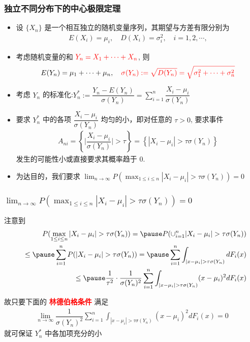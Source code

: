 \documentclass[Prob-All.tex]{subfiles}
\begin{document}
\begin{frame}
	\frametitle{独立不同分布下的中心极限定理}
	\begin{itemize}[<+-|alert@+>]
		\item 设 $\{X_n\}$ 是一个相互独立的随机变量序列，其期望与方差有限分别为
		\begin{eqnarray*}
			E(X_i)=\mu_i, \quad D(X_i)=\sigma_i^2, \quad i=1,2,\cdots,
		\end{eqnarray*}
		\item 考虑随机变量的和 $\textcolor{red}{Y_n=X_1+\cdots+X_n}$, 则
		\begin{eqnarray*}
			E(Y_n)=\mu_1+\cdots+\mu_n,\quad \textcolor{red}{\sigma(Y_n):=\sqrt{D(Y_n)}=\sqrt{\sigma_1^2+\cdots+\sigma_n^2}}
		\end{eqnarray*}
		\item 考虑 $Y_n$ 的标准化:$ Y_n^*:=\dfrac{Y_n-E (Y_n)}{\sigma (Y_n)}=\sum_{i=1}^n\dfrac{X_i-\mu_i}{\sigma (Y_n)}$
		\item 要求 $Y_n^*$ 中的各项 $\dfrac{X_i-\mu_i}{\sigma (Y_n)}$ 均匀的小，即对任意的 $\tau>0$, 要求事件
		\begin{eqnarray*}
			A_{ni}=\left\{\big|\dfrac{X_i-\mu_i}{\sigma(Y_n)}\big|>\tau\right\}=\left\{|X_i-\mu_i|>\tau\sigma(Y_n)\right\}
		\end{eqnarray*}
		发生的可能性小或直接要求其概率趋于 0.
		\item 为达目的，我们要求 $\lim_{n\rightarrow\infty} P (\max_{1\le i\le n}|X_i-\mu_i|>\tau\sigma (Y_n))=0$
	\end{itemize}
\end{frame}
\begin{frame}
	\frametitle{$\lim_{n\rightarrow\infty}P(\max_{1\le i\le n}|X_i-\mu_i|>\tau\sigma(Y_n))=0$}
	注意到
	\begin{eqnarray*}
		&&P(\max_{1\le i\le n}|X_i-\mu_i|>\tau\sigma(Y_n))=\pause P(\cup_{i=1}^n|X_i-\mu_i|>\tau\sigma(Y_n))\\
		&&\le\pause \sum_{i=1}^nP(|X_i-\mu_i|>\tau\sigma(Y_n))=\pause \sum_{i=1}^n\int_{|x-\mu_i|>\tau\sigma(Y_n)}dF_i(x)\\
		&&\le \pause \dfrac{1}{\tau^2}\cdot\dfrac{1}{\sigma(Y_n)^2}\sum_{i=1}^n\int_{|x-\mu_i|>\tau\sigma(Y_n)}(x-\mu_i)^2dF_i(x)
	\end{eqnarray*}

	\pause 故只要下面的 \textcolor{red}{\bf 林德伯格条件} 满足
	\begin{eqnarray*}%
		\lim_{n\rightarrow\infty} \dfrac{1}{\sigma(Y_n)^2}\sum_{i=1}^n\int_{|x-\mu_i|>\tau\sigma(Y_n)}(x-\mu_i)^2dF_i(x)=0
	\end{eqnarray*}
	就可保证 $Y_n^*$ 中各加项充分的小


\end{frame}
\end{document}

